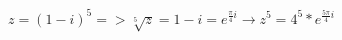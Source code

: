 \documentclass{article}
\begin{document}
\Large

$z=(1-i)^5 => \sqrt[5]{z}=1-i=e^{\frac{\pi}{4}i} \rightarrow z^5=4^5*e^{\frac{5\pi}{4}i}$
    
\end{document}
